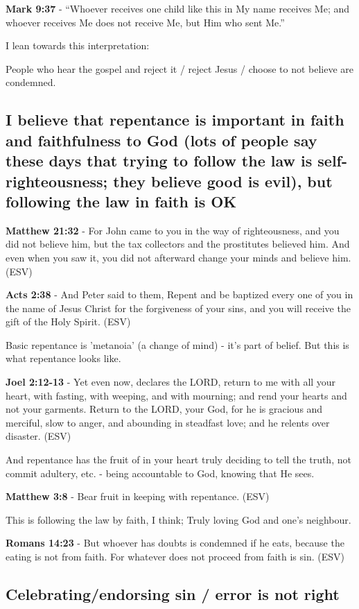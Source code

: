 \documentclass[11pt]{article}
\begin{document}
\textbf{Mark 9:37} - “Whoever receives one child like this in My name receives Me; and whoever receives Me does not receive Me, but Him who sent Me.”

I lean towards this interpretation:

People who hear the gospel and reject it / reject Jesus / choose to not believe are condemned.

\subsection{I believe that repentance is important in faith and faithfulness to God (lots of people say these days that trying to follow the law is self-righteousness; they believe good is evil), but following the law in faith is OK}
\label{sec:org4e3c2d2}

\textbf{Matthew 21:32} - For John came to you in the way of righteousness, and you did not believe him, but the tax collectors and the prostitutes believed him. And even when you saw it, you did not afterward change your minds and believe him. (ESV)

\textbf{Acts 2:38} - And Peter said to them, Repent and be baptized every one of you in the name of Jesus Christ for the forgiveness of your sins, and you will receive the gift of the Holy Spirit. (ESV)

Basic repentance is 'metanoia' (a change of mind) - it's part of belief.
But this is what repentance looks like.

\textbf{Joel 2:12-13} - Yet even now, declares the LORD, return to me with all your heart, with fasting, with weeping, and with mourning; and rend your hearts and not your garments. Return to the LORD, your God, for he is gracious and merciful, slow to anger, and abounding in steadfast love; and he relents over disaster. (ESV)

And repentance has the fruit of in your heart truly deciding to tell the truth, not commit adultery, etc. - being accountable to God, knowing that He sees.

\textbf{Matthew 3:8} - Bear fruit in keeping with repentance.  (ESV)

This is following the law by faith, I think; Truly loving God and one's neighbour.

\textbf{Romans 14:23} - But whoever has doubts is condemned if he eats, because the eating is not from faith. For whatever does not proceed from faith is sin. (ESV)

\subsection{Celebrating/endorsing sin / error is not right}
\label{sec:org4da9d34}
\end{document}
